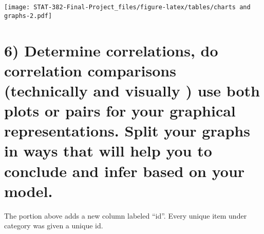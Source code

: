 \documentclass[
]{article}
\newenvironment{Shaded}{\begin{snugshade}}{\end{snugshade}}
\newcommand{\CommentTok}[1]{\textcolor[rgb]{0.56,0.35,0.01}{\textit{#1}}}
\newcommand{\DataTypeTok}[1]{\textcolor[rgb]{0.13,0.29,0.53}{#1}}
\newcommand{\DecValTok}[1]{\textcolor[rgb]{0.00,0.00,0.81}{#1}}
\newcommand{\KeywordTok}[1]{\textcolor[rgb]{0.13,0.29,0.53}{\textbf{#1}}}
\newcommand{\NormalTok}[1]{#1}
\newcommand{\OperatorTok}[1]{\textcolor[rgb]{0.81,0.36,0.00}{\textbf{#1}}}
\newcommand{\StringTok}[1]{\textcolor[rgb]{0.31,0.60,0.02}{#1}}
\begin{document}
\texttt{[image: STAT-382-Final-Project\_files/figure-latex/tables/charts and graphs-2.pdf]}

\hypertarget{determine-correlations-do-correlation-comparisons-technically-and-visually-use-both-plots-or-pairs-for-your-graphical-representations.-split-your-graphs-in-ways-that-will-help-you-to-conclude-and-infer-based-on-your-model.}{%
\section{6) Determine correlations, do correlation comparisons
(technically and visually ) use both plots or pairs for your graphical
representations. Split your graphs in ways that will help you to
conclude and infer based on your
model.}\label{determine-correlations-do-correlation-comparisons-technically-and-visually-use-both-plots-or-pairs-for-your-graphical-representations.-split-your-graphs-in-ways-that-will-help-you-to-conclude-and-infer-based-on-your-model.}}

The portion above adds a new column labeled ``id''. Every unique item
under category was given a unique id.

\begin{Shaded}
\end{Shaded}
\end{document}
